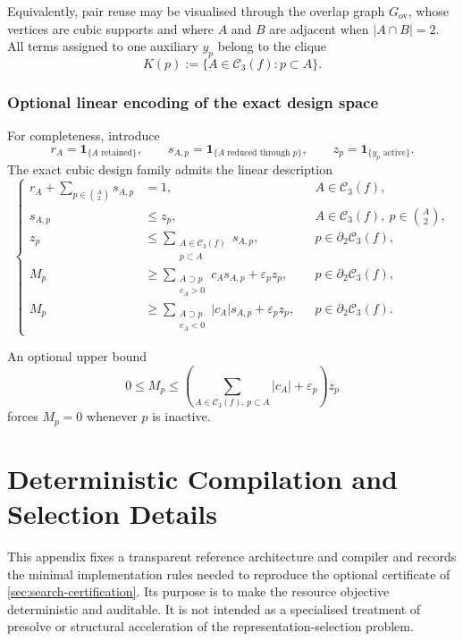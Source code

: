 \documentclass[a4paper,onecolumn,11pt,unpublished]{quantumarticle}
\theoremstyle{remark}
\begin{document}
Equivalently, pair reuse may be visualised through the overlap graph
$G_{\mathrm{ov}}$, whose vertices are cubic supports and where
$A$ and $B$ are adjacent when $|A\cap B|=2$. All terms assigned to one
auxiliary $y_p$ belong to the clique
\[
K(p):=\{A\in\mathcal C_3(f):p\subset A\}.
\]
\subsubsection{Optional linear encoding of the exact design space}
\label{app:linear-design}

For completeness, introduce
\[
r_A=\mathbf 1_{\{A\text{ retained}\}},
\qquad
s_{A,p}=\mathbf 1_{\{A\text{ reduced through }p\}},
\qquad
z_p=\mathbf 1_{\{y_p\text{ active}\}}.
\]
The exact cubic design family admits the linear description
\begin{equation}
\left\{
\begin{aligned}
r_A+\sum_{p\in\binom{A}{2}} s_{A,p} &= 1,
&& A\in\mathcal C_3(f),\\
s_{A,p} &\le z_p,
&& A\in\mathcal C_3(f),\ p\in\binom{A}{2},\\
z_p &\le
\sum_{\substack{A\in\mathcal C_3(f)\\p\subset A}} s_{A,p},
&& p\in\partial_2\mathcal C_3(f),\\
M_p &\ge
\sum_{\substack{A\supset p\\c_A>0}} c_A s_{A,p}
+\varepsilon_p z_p,
&& p\in\partial_2\mathcal C_3(f),\\
M_p &\ge
\sum_{\substack{A\supset p\\c_A<0}} |c_A| s_{A,p}
+\varepsilon_p z_p,
&& p\in\partial_2\mathcal C_3(f).
\end{aligned}
\right.
\label{eq:exact-design-system}
\end{equation}

An optional upper bound
\[
0\le M_p
\le
\left(
\sum_{A\in\mathcal C_3(f),\,p\subset A}|c_A|
+\varepsilon_p
\right)z_p
\]
forces $M_p=0$ whenever $p$ is inactive.

\section{Deterministic Compilation and Selection Details}
\label{app:certified-selection}

This appendix fixes a transparent reference architecture and compiler and
records the minimal implementation rules needed to reproduce the optional
certificate of \cref{sec:search-certification}.  Its purpose is to make the
resource objective deterministic and auditable.  It is not intended as a
specialised treatment of presolve or structural acceleration of the
representation-selection problem.
\end{document}
